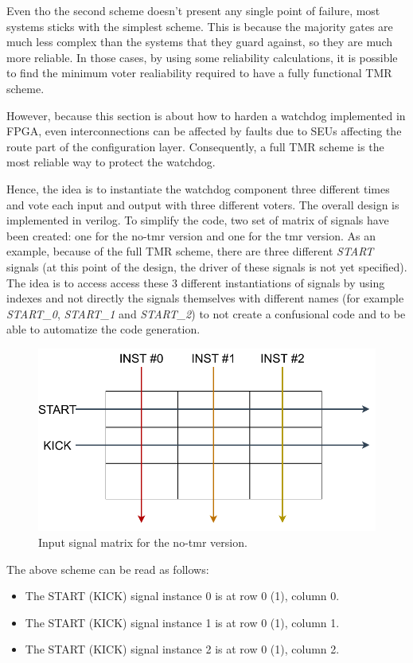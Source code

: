 Even tho the second scheme doesn't present any single point of failure, most systems sticks with the simplest scheme. This is because the majority gates are much less complex than the systems that they guard against, so they are much more reliable. In those cases, by using some reliability calculations, it is possible to find the minimum voter realiability required to have a fully functional TMR scheme. \bigskip

However, because this section is about how to harden a watchdog implemented in FPGA, even interconnections can be affected by faults due to SEUs affecting the route part of the configuration layer. Consequently, a full TMR scheme is the most reliable way to protect the watchdog.\bigskip

Hence, the idea is to instantiate the watchdog component three different times and vote each input and output with three different voters. The overall design is implemented in verilog. To simplify the code, two set of matrix of signals have been created: one for the no-tmr version and one for the tmr version. As an example, because of the full TMR scheme, there are three different \textit{START} signals (at this point of the design, the driver of these signals is not yet specified). The idea is to access access these 3 different instantiations of signals by using indexes and not directly the signals themselves with different names (for example \textit{START_0}, \textit{START_1} and \textit{START_2}) to not create a confusional code and to be able to automatize the code generation.

\begin{figure}[H]
\centering
\includegraphics[width=0.8\linewidth]{images/chapter4/mtx_notmr.pdf}
\caption{Input signal matrix for the no-tmr version.}
\label{fig:mtx_notmr}
\end{figure}

The above scheme can be read as follows:
\begin{itemize}
    \item The START (KICK) signal instance 0 is at row 0 (1), column 0.
    \item The START (KICK) signal instance 1 is at row 0 (1), column 1.
    \item The START (KICK) signal instance 2 is at row 0 (1), column 2.
\end{itemize}

